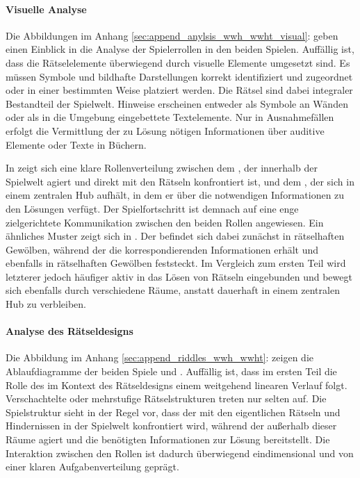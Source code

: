 \paragraph{Visuelle Analyse}
Die Abbildungen im Anhang \ref{sec:append_anylsis_wwh_wwht_visual}:  geben einen Einblick in die Analyse der Spielerrollen in den beiden Spielen. Auffällig ist, dass die Rätselelemente überwiegend durch visuelle Elemente umgesetzt sind. Es müssen Symbole und bildhafte Darstellungen korrekt identifiziert und zugeordnet oder in einer bestimmten Weise platziert werden. Die Rätsel sind dabei integraler Bestandteil der Spielwelt. Hinweise erscheinen entweder als Symbole an Wänden oder als in die Umgebung eingebettete Textelemente. Nur in Ausnahmefällen erfolgt die Vermittlung der zu Lösung nötigen Informationen über auditive Elemente oder Texte in Büchern.

In  zeigt sich eine klare Rollenverteilung zwischen dem , der innerhalb der Spielwelt agiert und direkt mit den Rätseln konfrontiert ist, und dem , der sich in einem zentralen Hub aufhält, in dem er über die notwendigen Informationen zu den Lösungen verfügt. Der Spielfortschritt ist demnach auf eine enge zielgerichtete Kommunikation zwischen den beiden Rollen angewiesen. Ein ähnliches Muster zeigt sich in  . Der  befindet sich dabei zunächst in rätselhaften Gewölben, während der  die korrespondierenden Informationen erhält und ebenfalls in rätselhaften Gewölben feststeckt. Im Vergleich zum ersten Teil wird letzterer jedoch häufiger aktiv in das Lösen von Rätseln eingebunden und bewegt sich ebenfalls durch verschiedene Räume, anstatt dauerhaft in einem zentralen Hub zu verbleiben.

\paragraph{Analyse des Rätseldesigns}
Die Abbildung im Anhang \ref{sec:append_riddles_wwh_wwht}:  zeigen die Ablaufdiagramme der beiden Spiele  und . Auffällig ist, dass im ersten Teil die Rolle des  im Kontext des Rätseldesigns einem weitgehend linearen Verlauf folgt. Verschachtelte oder mehrstufige Rätselstrukturen treten nur selten auf. Die Spielstruktur sieht in der Regel vor, dass der  mit den eigentlichen Rätseln und Hindernissen in der Spielwelt konfrontiert wird, während der  außerhalb dieser Räume agiert und die benötigten Informationen zur Lösung bereitstellt. Die Interaktion zwischen den Rollen ist dadurch überwiegend eindimensional und von einer klaren Aufgabenverteilung geprägt.

